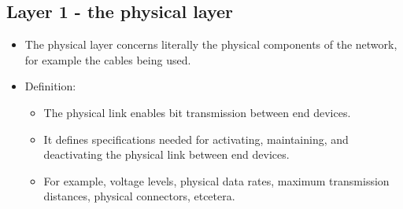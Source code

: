 \subsection{Layer 1 - the physical layer}
\begin{itemize}
    \item The physical layer concerns literally the physical components of the network, for example the cables being used.
    \item Definition:
        \begin{itemize}
            \item The physical link enables bit transmission between end devices.
            \item It defines specifications needed for activating, maintaining, and deactivating the physical link between end devices.
            \item For example, voltage levels, physical data rates, maximum transmission distances, physical connectors, etcetera.
        \end{itemize}
\end{itemize}
